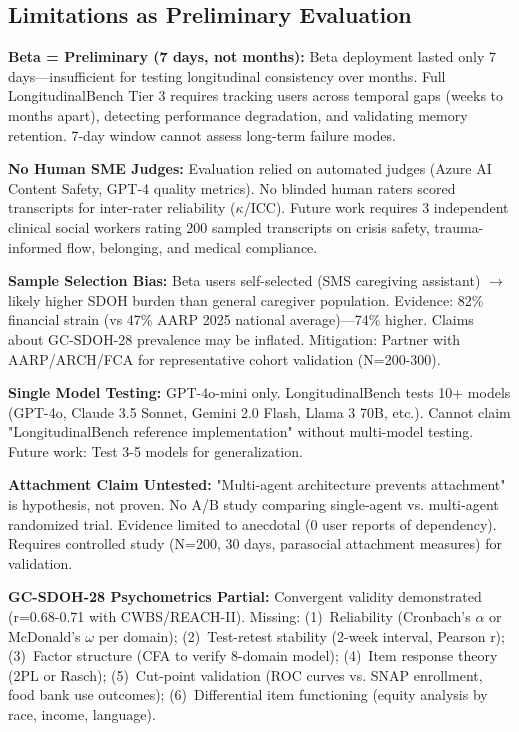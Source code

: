 \documentclass{article}%
\begin{document}
%
\subsection{Limitations as Preliminary Evaluation}%
\label{subsec:LimitationsasPreliminaryEvaluation}%
\textbf{Beta = Preliminary (7 days, not months):} Beta deployment lasted only 7 days—insufficient for testing longitudinal consistency over months. Full LongitudinalBench Tier 3 requires tracking users across temporal gaps (weeks to months apart), detecting performance degradation, and validating memory retention. 7-day window cannot assess long-term failure modes.

\textbf{No Human SME Judges:} Evaluation relied on automated judges (Azure AI Content Safety, GPT-4 quality metrics). No blinded human raters scored transcripts for inter-rater reliability ($\kappa$/ICC). Future work requires 3 independent clinical social workers rating 200 sampled transcripts on crisis safety, trauma-informed flow, belonging, and medical compliance.

\textbf{Sample Selection Bias:} Beta users self-selected (SMS caregiving assistant) $\rightarrow$ likely higher SDOH burden than general caregiver population. Evidence: 82\% financial strain (vs 47\% AARP 2025 national average)—74\% higher. Claims about GC-SDOH-28 prevalence may be inflated. Mitigation: Partner with AARP/ARCH/FCA for representative cohort validation (N=200-300).

\textbf{Single Model Testing:} GPT-4o-mini only. LongitudinalBench tests 10+ models (GPT-4o, Claude 3.5 Sonnet, Gemini 2.0 Flash, Llama 3 70B, etc.). Cannot claim "LongitudinalBench reference implementation" without multi-model testing. Future work: Test 3-5 models for generalization.

\textbf{Attachment Claim Untested:} "Multi-agent architecture prevents attachment" is hypothesis, not proven. No A/B study comparing single-agent vs. multi-agent randomized trial. Evidence limited to anecdotal (0 user reports of dependency). Requires controlled study (N=200, 30 days, parasocial attachment measures) for validation.

\textbf{GC-SDOH-28 Psychometrics Partial:} Convergent validity demonstrated (r=0.68-0.71 with CWBS/REACH-II). Missing: (1)~Reliability (Cronbach's $\alpha$ or McDonald's $\omega$ per domain); (2)~Test-retest stability (2-week interval, Pearson r); (3)~Factor structure (CFA to verify 8-domain model); (4)~Item response theory (2PL or Rasch); (5)~Cut-point validation (ROC curves vs. SNAP enrollment, food bank use outcomes); (6)~Differential item functioning (equity analysis by race, income, language).
\end{document}
